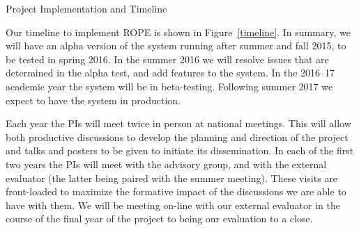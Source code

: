 \documentclass[11pt]{article}
\begin{document}
\begin{section}{Project Implementation and Timeline}

Our timeline to implement ROPE is shown in Figure~\ref{timeline}.  In
summary, we will have an alpha version of the system running after summer
and fall 2015, to be tested in spring 2016.  In the summer 2016 we
will resolve issues that are determined in the alpha test, and add
features to the system.  In the 2016--17 academic year the system will be
in beta-testing.  Following summer 2017 we expect to have the system in
production.

Each year the PIs will meet twice in person at national meetings.  This
will allow both productive discussions to develop the planning and
direction of the project and talks and posters to be given to initiate its
dissemination.  In each of the first two years the PIs will meet with the
advisory group, and with the external evaluator (the latter being paired
with the summer meeting).  These visits are front-loaded to maximize the
formative impact of the discussions we are able to have with them.  We
will be meeting on-line with our external evaluator in the course of the
final year of the project to being our evaluation to a close.


\end{section}
\end{document}
